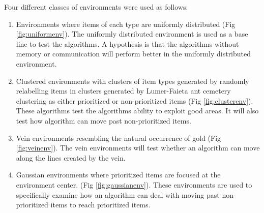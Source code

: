 Four different classes of environments were used as follows:
\begin{enumerate}
\item Environments where items of each type are uniformly distributed (Fig \ref{fig:uniformenv}). The uniformly distributed environment is used as a base line to test the algorithms. A hypothesis is that the algorithms without memory or communication will perform better in the uniformly distributed environment. 
\item Clustered environments with clusters of item types generated by randomly relabelling items in clusters generated by Lumer-Faieta ant cemetery clustering \cite{lumer1994diversity} as either prioritized or non-prioritized items (Fig \ref{fig:clusterenv}). These algorithms test the algorithms ability to exploit good areas. It will also test how algorithm can move past non-prioritized items. 
\item Vein environments resembling the natural occurrence of gold \cite{frimmel2002recent} (Fig \ref{fig:veinenv}). The vein environments will test whether an algorithm can move along the lines created by the vein. 
\item Gaussian environments where prioritized items are focused at the environment center. (Fig \ref{fig:gaussianenv}). These environments are used to specifically examine how an algorithm can deal with moving past non-prioritized items to reach prioritized items. 
\end{enumerate} 

